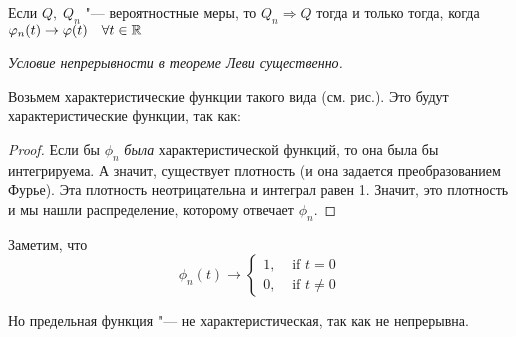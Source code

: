 \begin{col}
    Если $Q, \;Q_n$  "--- вероятностные меры, то
    $Q_n \Rightarrow Q$ тогда и только тогда, когда $\varphi_n(t) \to \varphi(t) \quad \forall t \in \mathbb{R}$
\end{col}
\begin{example}
    \emph{Условие непрерывности в теореме Леви существенно.}

Возьмем характеристические функции такого вида (см. рис.). Это будут\\характеристические функции, так как:

    \parbox[b][5cm][t]{0.65\textwidth}{
\begin{proof}
    Если бы $\phi_n$ \emph{была} характеристической функций, то она была бы интегрируема. А значит, существует плотность (и она задается преобразованием Фурье). Эта плотность неотрицательна и интеграл равен 1. Значит, это плотность и мы нашли распределение, которому отвечает $\phi_n$.
\end{proof}
Заметим, что $$\phi_n(t) \to \begin{cases}
    1, &\text{ if }t = 0\\
    0, &\text{ if }t \ne 0
\end{cases}$$
}
\hfill
\parbox[b][5cm][t]{0.3\textwidth}{}
Но предельная функция "--- не характеристическая, так как не непрерывна.
\end{example}